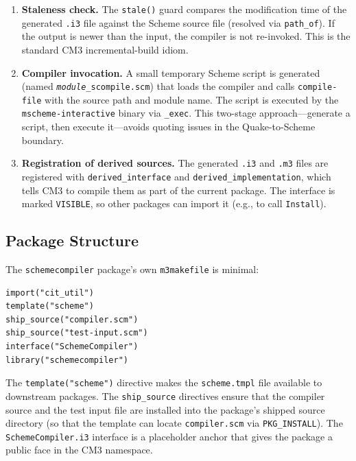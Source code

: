 \documentclass[12pt]{report}
\begin{document}
\begin{enumerate}
\item \textbf{Staleness check.}  The \texttt{stale()} guard compares
  the modification time of the generated \texttt{.i3} file against
  the Scheme source file (resolved via \texttt{path\_of}).  If the
  output is newer than the input, the compiler is not re-invoked.
  This is the standard CM3 incremental-build idiom.

\item \textbf{Compiler invocation.}  A small temporary Scheme script
  is generated (named \texttt{\emph{module}\_scompile.scm}) that
  loads the compiler and calls \texttt{compile-file} with the source
  path and module name.  The script is executed by the
  \texttt{mscheme-interactive} binary via \texttt{\_exec}.
  This two-stage approach---generate a script, then execute it---avoids
  quoting issues in the Quake-to-Scheme boundary.

\item \textbf{Registration of derived sources.}  The generated
  \texttt{.i3} and \texttt{.m3} files are registered with
  \texttt{derived\_interface} and \texttt{derived\_implementation},
  which tells CM3 to compile them as part of the current package.
  The interface is marked \texttt{VISIBLE}, so other packages can
  import it (e.g., to call \texttt{Install}).
\end{enumerate}

\subsection{Package Structure}

The \texttt{schemecompiler} package's own \texttt{m3makefile}
is minimal:

\begin{lstlisting}
import("cit_util")
template("scheme")
ship_source("compiler.scm")
ship_source("test-input.scm")
interface("SchemeCompiler")
library("schemecompiler")
\end{lstlisting}

The \texttt{template("scheme")} directive makes the
\texttt{scheme.tmpl} file available to downstream packages.  The
\texttt{ship\_source} directives ensure that the compiler source and
the test input file are installed into the package's shipped source
directory (so that the template can locate \texttt{compiler.scm} via
\texttt{PKG\_INSTALL}).  The \texttt{SchemeCompiler.i3} interface is
a placeholder anchor that gives the package a public face in the CM3
namespace.
\end{document}
